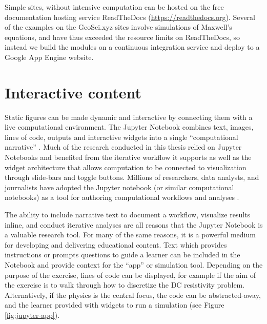 



Simple sites, without intensive computation can be hosted on the free documentation hosting service ReadTheDocs (\href{https://readthedocs.org}{https://readthedocs.org}). Several of the examples on the GeoSci.xyz sites involve simulations of Maxwell's equations, and have thus exceeded the resource limits on ReadTheDocs, so instead we build the modules on a continuous integration service and deploy to a Google App Engine website.

\section{Interactive content}
\label{sec:interactive}

Static figures can be made dynamic and interactive by connecting them with a live computational environment. The Jupyter Notebook combines text, images, lines of code, outputs and interactive widgets into a single ``computational narrative'' \citep{Perez2015}. Much of the research conducted in this thesis relied on Jupyter Notebooks and benefited from the iterative workflow it supports as well as the widget architecture that allows computation to be connected to visualization through slide-bars and toggle buttons. Millions of researchers, data analysts, and journalists have adopted the Jupyter notebook (or similar computational notebooks) as a tool for authoring computational workflows and analyses \citep{Rule2018}.

The ability to include narrative text to document a workflow, visualize results inline, and conduct iterative analyses are all reasons that the Jupyter Notebook is a valuable research tool. For many of the same reasons, it is a powerful medium for developing and delivering educational content. Text which provides instructions or prompts questions to guide a learner can be included in the Notebook and provide context for the ``app'' or simulation tool. Depending on the purpose of the exercise, lines of code can be displayed, for example if the aim of the exercise is to walk through how to discretize the DC resistivity problem. Alternatively, if the physics is the central focus, the code can be abstracted-away, and the learner provided with widgets to run a simulation (see Figure \ref{fig:jupyter-app}).




